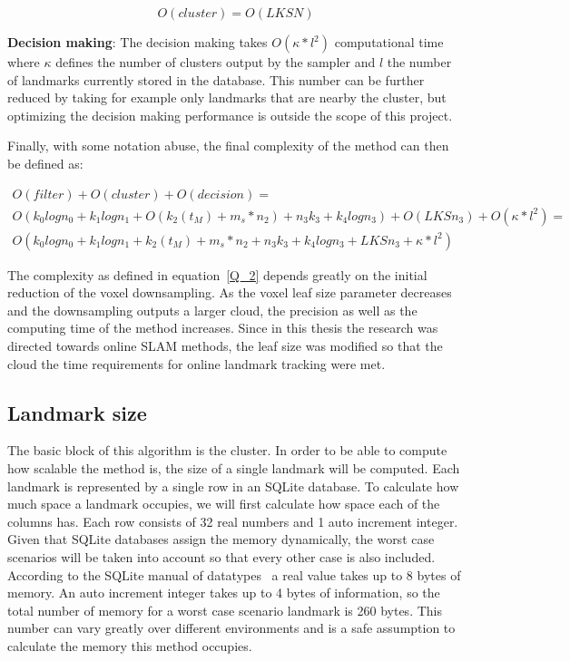 \documentclass[twoside,hidelinks]{article}
\begin{document}
$$
O(cluster) = O(LKSN)
$$

\textbf{Decision making}: The decision making takes $ O(\kappa * l^2) $ computational time where $\kappa$ defines the number of clusters output by the sampler and $l$ the number of landmarks currently stored in the database. This number can be further reduced by taking for example only landmarks that are nearby the cluster, but optimizing the decision making performance is outside the scope of this project.


Finally, with some notation abuse, the final complexity of the method can then be defined as:

\begin{equation} \label{Q_2}
\begin{split}
O(filter) + O(cluster) + O(decision) = \\
O(k_{0}logn_{0} + k_{1}logn_{1} + O(k_{2}(t_M)+ m_s*n_{2}) + n_{3}k_{3} + k_{4}logn_{3} ) + O(LKSn_3) + O(\kappa * l^2)=\\
O(k_{0}logn_{0} + k_{1}logn_{1} + k_{2}(t_M)+ m_s*n_{2} + n_{3}k_{3} + k_{4}logn_{3} + LKSn_3 + \kappa * l^2)
\end{split}
\end{equation}

The complexity as defined in equation~\ref{Q_2} depends greatly on the initial reduction of the voxel downsampling. As the voxel leaf size parameter decreases and the downsampling outputs a larger cloud, the precision as well as the computing time of the method increases. Since in this thesis the research was directed towards online SLAM methods, the leaf size was modified so that the cloud the time requirements for online landmark tracking were met.

\subsection{Landmark size}

The basic block of this algorithm is the cluster. In order to be able to compute how scalable the method is, the size of a single landmark will be computed. Each landmark is represented by a single row in an SQLite database. To calculate how much space a landmark occupies, we will first calculate how space each of the columns has. Each row consists of 32 real numbers and 1 auto increment integer. Given that SQLite databases assign the memory dynamically, the worst case scenarios will be taken into account so that every other case is also included. According to the SQLite manual of datatypes~\cite{sqlite} a real value takes up to 8 bytes of memory. An auto increment integer takes up to 4 bytes of information, so the total number  of memory for a worst case scenario landmark is 260 bytes. This number can vary greatly over different environments and is a safe assumption to calculate the memory this method occupies.
\end{document}
